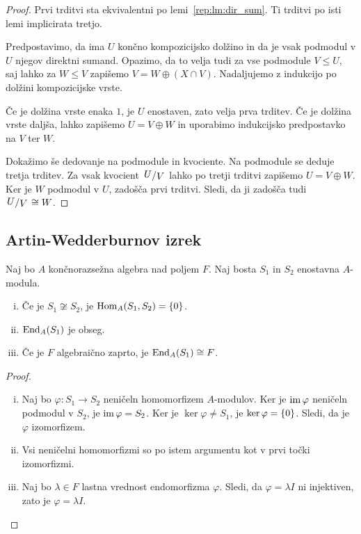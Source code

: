 \begin{proof}
Prvi trditvi sta ekvivalentni po lemi~\ref{rep:lm:dir_sum}. Ti
trditvi po isti lemi implicirata tretjo.

Predpostavimo, da ima $U$ končno kompozicijsko dolžino in da je
vsak podmodul v $U$ njegov direktni sumand. Opazimo, da to velja
tudi za vse podmodule $V \leq U$, saj lahko za $W \leq V$ zapišemo
$V = W \oplus (X \cap V)$. Nadaljujemo z indukcijo po dolžini
kompozicijske vrste.

Če je dolžina vrste enaka $1$, je $U$ enostaven, zato velja prva
trditev. Če je dolžina vrste daljša, lahko zapišemo
$U = V \oplus W$ in uporabimo indukcijsko predpostavko na $V$ ter
$W$.

Dokažimo še dedovanje na podmodule in kvociente. Na podmodule se
deduje tretja trditev. Za vsak kvocient $\kvoc{U}{V}$ lahko po
tretji trditvi zapišemo $U = V \oplus W$. Ker je $W$ podmodul v
$U$, zadošča prvi trditvi. Sledi, da ji zadošča tudi
$\kvoc{U}{V} \cong W$.
\end{proof}

\newpage

\subsection{Artin-Wedderburnov izrek}

\begin{izrek}
Naj bo $A$ končnorazsežna algebra nad poljem $F$. Naj bosta $S_1$
in $S_2$ enostavna $A$-modula.

\begin{enumerate}[i)]
\item Če je $S_1 \not \cong S_2$, je $\operatorname{Hom}_A(S_1, S_2) = \left\{0\right\}$.
\item $\operatorname{End}_A(S_1)$ je obseg.
\item Če je $F$ algebraično zaprto, je $\operatorname{End}_A(S_1) \cong F$.
\end{enumerate}
\end{izrek}

\begin{proof}
\phantom{a}
\begin{enumerate}[i)]
\item Naj bo $\varphi \colon S_1 \to S_2$ neničeln homomorfizem
$A$-modulov. Ker je $\operatorname{im} \varphi$ neničeln podmodul v $S_2$, je
$\operatorname{im} \varphi = S_2$. Ker je $\ker \varphi \ne S_1$, je
$\ker \varphi = \left\{0\right\}$. Sledi, da je $\varphi$ izomorfizem.
\item Vsi neničelni homomorfizmi so po istem argumentu kot v prvi
točki izomorfizmi.
\item Naj bo $\lambda \in F$ lastna vrednost endomorfizma
$\varphi$. Sledi, da $\varphi = \lambda I$ ni injektiven, zato je
$\varphi = \lambda I$. \qedhere
\end{enumerate}
\end{proof}


